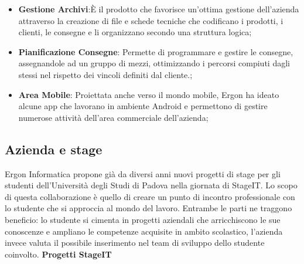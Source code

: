 \begin{itemize}
	\item \textbf{Gestione Archivi}:È il prodotto che favorisce un’ottima gestione dell’azienda attraverso la creazione di file e schede tecniche che codificano i prodotti, i clienti, le consegne e li organizzano secondo una struttura logica;
	
	\item \textbf{Pianificazione Consegne}: Permette di programmare e gestire le consegne, assegnandole ad un gruppo di mezzi, ottimizzando i percorsi compiuti dagli stessi nel rispetto dei vincoli definiti dal cliente.;
	
	\item \textbf{Area Mobile}: Proiettata anche verso il mondo mobile, Ergon ha ideato alcune app che lavorano in ambiente Android e permettono di gestire numerose attività dell'area commerciale dell'azienda;
	
	
\end{itemize}

\subsection{Azienda e stage}

Ergon Informatica propone già da diversi anni nuovi progetti di stage per gli studenti dell'Università degli Studi di Padova nella giornata di StageIT. Lo scopo di questa collaborazione è quello di creare un punto di incontro professionale con lo studente che si approccia al mondo del lavoro. Entrambe le parti ne traggono beneficio: lo studente si cimenta in progetti aziendali che arricchiscono le sue conoscenze e ampliano le competenze acquisite in ambito scolastico, l'azienda invece valuta il possibile inserimento nel team di sviluppo dello studente coinvolto.
\newline
\newline
\textbf{Progetti StageIT}

